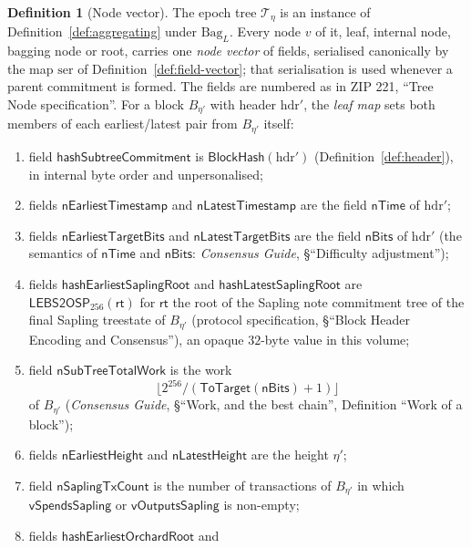 \documentclass[11pt,a4paper]{article}
\theoremstyle{definition}
\newtheorem{definition}[theorem]{Definition}
\begin{document}
\begin{definition}[Node vector]\label{def:node-vector}
The epoch tree $\mathcal{T}_\eta$ is an instance of
Definition~\ref{def:aggregating} under $\mathrm{Bag}_L$. Every node $v$ of
it, leaf, internal node, bagging node or root, carries one \emph{node
vector} of fields, serialised canonically by the map $\mathrm{ser}$ of
Definition~\ref{def:field-vector}; that serialisation is used whenever a
parent commitment is formed. The fields are numbered as in ZIP 221, ``Tree
Node specification''. For a block $B_{\eta'}$ with header $\mathrm{hdr}'$, the
\emph{leaf map} sets both members of each earliest/latest pair from
$B_{\eta'}$ itself:
\begin{enumerate}[label=(\arabic*),
  leftmargin=\widthof{(15)--(17)}+\labelsep]
\item field $\mathsf{hashSubtreeCommitment}$ is
  $\mathsf{BlockHash}(\mathrm{hdr}')$ (Definition~\ref{def:header}), in internal
  byte order and unpersonalised;
\item[(2), (3)] fields $\mathsf{nEarliestTimestamp}$ and
  $\mathsf{nLatestTimestamp}$ are the field $\mathsf{nTime}$ of $\mathrm{hdr}'$;
\item[(4), (5)] fields $\mathsf{nEarliestTargetBits}$ and
  $\mathsf{nLatestTargetBits}$ are the field $\mathsf{nBits}$ of $\mathrm{hdr}'$
  (the semantics of $\mathsf{nTime}$ and $\mathsf{nBits}$: \emph{Consensus
  Guide}, \S``Difficulty adjustment'');
\item[(6), (7)] fields $\mathsf{hashEarliestSaplingRoot}$ and
  $\mathsf{hashLatestSaplingRoot}$ are $\mathsf{LEBS2OSP}_{256}(\mathsf{rt})$
  for $\mathsf{rt}$ the root of the Sapling note commitment tree of the
  final Sapling treestate of $B_{\eta'}$ (protocol specification,
  \S``Block Header Encoding and Consensus''), an opaque $32$-byte value in
  this volume;
\item[(8)] field $\mathsf{nSubTreeTotalWork}$ is the work
  \[
  \lfloor 2^{256} / (\mathsf{ToTarget}(\mathsf{nBits}) + 1) \rfloor
  \]
  of $B_{\eta'}$ (\emph{Consensus Guide}, \S``Work, and the best chain'',
  Definition ``Work of a block'');
\item[(9), (10)] fields $\mathsf{nEarliestHeight}$ and
  $\mathsf{nLatestHeight}$ are the height $\eta'$;
\item[(11)] field $\mathsf{nSaplingTxCount}$ is the number of transactions of
  $B_{\eta'}$ in which $\mathsf{vSpendsSapling}$ or $\mathsf{vOutputsSapling}$
  is non-empty;
\item[(12), (13)] fields $\mathsf{hashEarliestOrchardRoot}$ and

\end{enumerate}
\end{definition}
\end{document}
